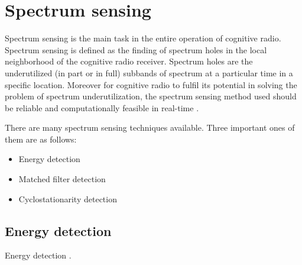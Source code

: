 \chapter{Spectrum sensing}

Spectrum sensing is the main task in the entire operation of cognitive
radio. Spectrum sensing is defined as the finding of spectrum holes in 
the local neighborhood of the cognitive radio receiver. Spectrum holes are the
underutilized (in part or in full) subbands of spectrum at a particular time
in a specific location. Moreover for cognitive radio to fulfil its potential
in solving the problem of spectrum underutilization, the spectrum sensing 
method used should be reliable and computationally feasible in real-time 
\cite{haykin09}.

There are many spectrum sensing techniques available. Three important ones of
them are as follows:
\begin{itemize}
    \item Energy detection
    \item Matched filter detection
    \item Cyclostationarity detection
\end{itemize}

\section{Energy detection}
Energy detection \cite{zhang09}.